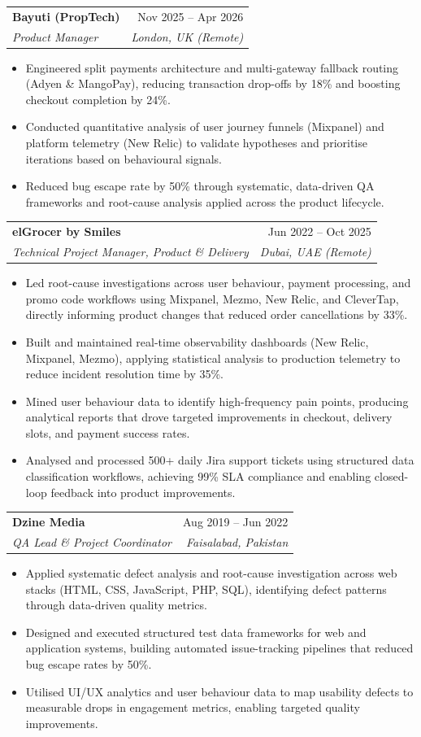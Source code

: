 \documentclass[letterpaper,10pt]{article}
\makeatletter
\newcommand{\resumeItem}[1]{
  \item\small{
    {#1 \vspace{-2pt}}
  }
}
\newcommand{\resumeSubheading}[4]{
  \vspace{-2pt}\item
    \begin{tabular*}{0.97\textwidth}[t]{l@{\extracolsep{\fill}}r}
      \textbf{#1} & #2 \\
      \textit{\small#3} & \textit{\small #4} \\
    \end{tabular*}\vspace{-7pt}
}
\newcommand{\resumeItemListStart}{\begin{itemize}[leftmargin=0.15in]}
\newcommand{\resumeItemListEnd}{\end{itemize}\vspace{-5pt}}
\makeatother
\begin{document}
    \resumeSubheading
      {Bayuti (PropTech)}{Nov 2025 – Apr 2026}
      {Product Manager}{London, UK (Remote)}
      \resumeItemListStart
        \resumeItem{Engineered split payments architecture and multi-gateway fallback routing (Adyen \& MangoPay), reducing transaction drop-offs by 18\% and boosting checkout completion by 24\%.}
        \resumeItem{Conducted quantitative analysis of user journey funnels (Mixpanel) and platform telemetry (New Relic) to validate hypotheses and prioritise iterations based on behavioural signals.}
        \resumeItem{Reduced bug escape rate by 50\% through systematic, data-driven QA frameworks and root-cause analysis applied across the product lifecycle.}
      \resumeItemListEnd

    \resumeSubheading
      {elGrocer by Smiles}{Jun 2022 – Oct 2025}
      {Technical Project Manager, Product \& Delivery}{Dubai, UAE (Remote)}
      \resumeItemListStart
        \resumeItem{Led root-cause investigations across user behaviour, payment processing, and promo code workflows using Mixpanel, Mezmo, New Relic, and CleverTap, directly informing product changes that reduced order cancellations by 33\%.}
        \resumeItem{Built and maintained real-time observability dashboards (New Relic, Mixpanel, Mezmo), applying statistical analysis to production telemetry to reduce incident resolution time by 35\%.}
        \resumeItem{Mined user behaviour data to identify high-frequency pain points, producing analytical reports that drove targeted improvements in checkout, delivery slots, and payment success rates.}
        \resumeItem{Analysed and processed 500+ daily Jira support tickets using structured data classification workflows, achieving 99\% SLA compliance and enabling closed-loop feedback into product improvements.}
      \resumeItemListEnd

    \resumeSubheading
      {Dzine Media}{Aug 2019 – Jun 2022}
      {QA Lead \& Project Coordinator}{Faisalabad, Pakistan}
      \resumeItemListStart
        \resumeItem{Applied systematic defect analysis and root-cause investigation across web stacks (HTML, CSS, JavaScript, PHP, SQL), identifying defect patterns through data-driven quality metrics.}
        \resumeItem{Designed and executed structured test data frameworks for web and application systems, building automated issue-tracking pipelines that reduced bug escape rates by 50\%.}
        \resumeItem{Utilised UI/UX analytics and user behaviour data to map usability defects to measurable drops in engagement metrics, enabling targeted quality improvements.}
      \resumeItemListEnd
\end{document}
